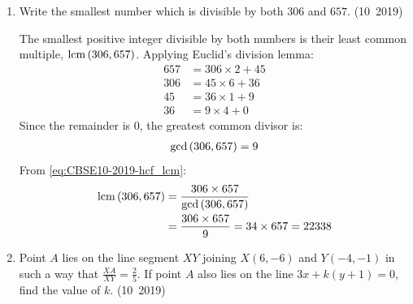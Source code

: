 \begin{enumerate}[label=\thesubsection.\arabic*, ref=\thesubsection.\theenumi]
	\item Write the smallest number which is divisible by both $306$ and $657$.
	\hfill (10~2019)
	
	\solution
	The smallest positive integer divisible by both numbers is their least common multiple, $\operatorname{lcm}\left(306, 657\right)$.
	Applying Euclid's division lemma:
	\begin{align}
		657 &= 306 \times 2 + 45 \\
		306 &= 45 \times 6 + 36 \\
		45 &= 36 \times 1 + 9 \\
		36 &= 9 \times 4 + 0
	\end{align}
	Since the remainder is $0$, the greatest common divisor is:
	\begin{align}
		\gcd\left(306, 657\right) = 9
	\end{align}
	From \eqref{eq:CBSE10-2019-hcf_lcm}:
	\begin{align}
		\operatorname{lcm}\left(306, 657\right) &= \frac{306 \times 657}{\gcd\left(306, 657\right)} \\
		&= \frac{306 \times 657}{9} = 34 \times 657 = 22338
	\end{align}

	\item Point $A$ lies on the line segment $XY$ joining $X(6,-6)$ and $Y(-4,-1)$ in such a way that $\frac{XA}{XY}=\frac{2}{5}$. If point $A$ also lies on the line $3x+k(y+1)=0$, find the value of $k$.
	\hfill (10~2019)
	

\end{enumerate}
